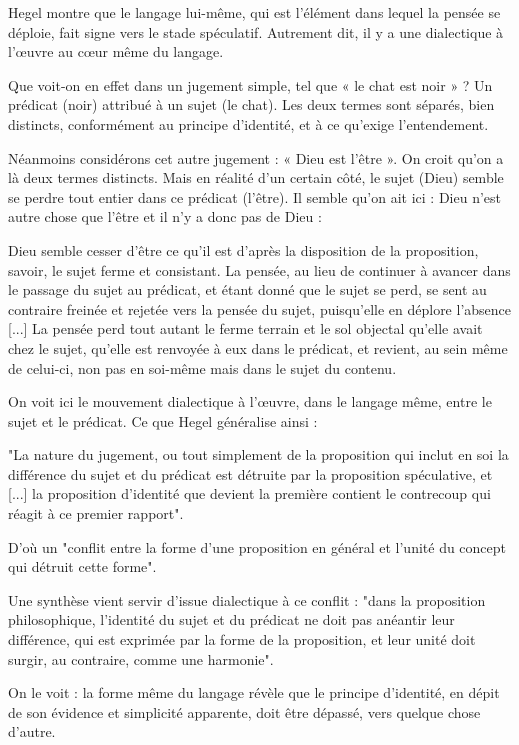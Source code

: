 Hegel montre que le langage lui-même, qui est l'élément dans lequel la pensée se déploie, fait signe vers le stade spéculatif. Autrement dit, il y a une dialectique à l’œuvre au cœur même du langage.

Que voit-on en effet dans un jugement simple, tel que « le chat est noir » ? Un prédicat (noir) attribué à un sujet (le chat). Les deux termes sont séparés, bien distincts, conformément au principe d’identité, et à ce qu’exige l’entendement.

Néanmoins considérons cet autre jugement : « Dieu est l’être ». On croit qu’on a là deux termes distincts. Mais en réalité d’un certain côté, le sujet (Dieu) semble se perdre tout entier dans ce prédicat (l’être). Il semble qu’on ait ici : Dieu n’est autre chose que l’être et il n’y a donc pas de Dieu :

    Dieu semble cesser d’être ce qu’il est d’après la disposition de la proposition, savoir, le sujet ferme et consistant. La pensée, au lieu de continuer à avancer dans le passage du sujet au prédicat, et étant donné que le sujet se perd, se sent au contraire freinée et rejetée vers la pensée du sujet, puisqu’elle en déplore l’absence [...] La pensée perd tout autant le ferme terrain et le sol objectal qu'elle avait chez le sujet, qu’elle est renvoyée à eux dans le prédicat, et revient, au sein même de celui-ci, non pas en soi-même mais dans le sujet du contenu.


On voit ici le mouvement dialectique à l’œuvre, dans le langage même, entre le sujet et le prédicat. Ce que Hegel généralise ainsi :

"La nature du jugement, ou tout simplement de la proposition qui inclut en soi la différence du sujet et du prédicat est détruite par la proposition spéculative, et [...] la proposition d’identité que devient la première contient le contrecoup qui réagit à ce premier rapport".

D’où un "conflit entre la forme d’une proposition en général et l’unité du concept qui détruit cette forme".

Une synthèse vient servir d’issue dialectique à ce conflit : "dans la proposition philosophique, l’identité du sujet et du prédicat ne doit pas anéantir leur différence, qui est exprimée par la forme de la proposition, et leur unité doit surgir, au contraire, comme une harmonie".

On le voit : la forme même du langage révèle que le principe d'identité, en dépit de son évidence et simplicité apparente, doit être dépassé, vers quelque chose d’autre.

